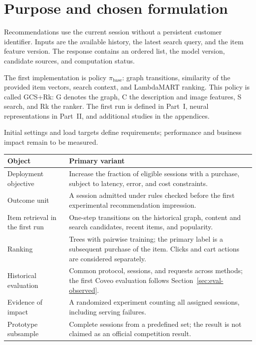 \documentclass[12pt,a4paper]{article}
\theoremstyle{plainru}
\begin{document}
\section{Purpose and chosen formulation}\label{sec:scope}

Recommendations use the current session without a persistent
customer identifier. Inputs are the available history, the latest search
query, and the item feature version. The response contains an ordered list,
the model version, candidate sources, and computation status.

The first implementation is policy \(\pi_{\mathrm{base}}\): graph
transitions, similarity of the provided item vectors, search context,
and LambdaMART ranking. This policy is called GCS+Rk:
G denotes the graph, C the description and image features,
S search, and Rk the ranker.
The first run is defined in Part~I, neural representations in
Part~II, and additional studies in the appendices.

Initial settings and load targets define requirements;
performance and business impact remain to be measured.

\begin{longtable}{L{0.28\textwidth}L{0.64\textwidth}}
\toprule Object & Primary variant \\\midrule\endhead
Deployment objective & Increase the fraction of eligible sessions with a purchase, subject to
latency, error, and cost constraints. \\
Outcome unit & A session admitted under rules checked before the first
experimental recommendation impression. \\
Item retrieval in the first run & One-step transitions on the historical
graph, content and search candidates, recent items, and popularity. \\
Ranking & Trees with pairwise training; the primary label is a subsequent
purchase of the item. Clicks and cart actions are considered separately. \\
Historical evaluation & Common protocol, sessions, and requests across methods;
the first Coveo evaluation follows Section~\ref{sec:eval-observed}. \\
Evidence of impact & A randomized experiment counting all
assigned sessions, including serving failures. \\
Prototype subsample & Complete sessions from a predefined set;
the result is not claimed as an official competition result. \\
\bottomrule
\end{longtable}
\end{document}
